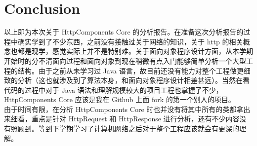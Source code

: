\documentclass{article}
\begin{document}
	\clearpage
	\section{Conclusion}
	\begin{CJK}{UTF8}{gbsn}
		\indent \indent 以上即为本次关于 HttpComponents Core 的分析报告。在准备这次分析报告的过程中确实学到了不少东西，之前没有接触过关于网络的知识，关于 http 的相关概念也都是现学，感觉实际上并不是特别难。关于面向对象程序设计方面，从本学期开始时的分不清面向过程和面向对象到现在稍微有点入门能够简单分析一个大型工程的结构。由于之前从未学习过 Java 语言，故目前还没有能力对整个工程做更细致的分析（这也就涉及到了算法本身，和面向对象程序设计相差甚远）。当然在看代码的过程中对于 Java 语法和理解规模较大的项目工程也掌握了不少，HttpComponents Core 应该是我在 Github 上面 fork 的第一个别人的项目。\\
		\indent 由于时间有限，在分析 HttpComponents Core 时也并没有将其中所有的类都拿出来细看，重点是针对 HttpRequest 和 HttpResponse 进行分析，还有不少内容没有照顾到。等到下学期学习了计算机网络之后对于整个工程应该就会有更深的理解。
	\end{CJK}{}
\end{document}
